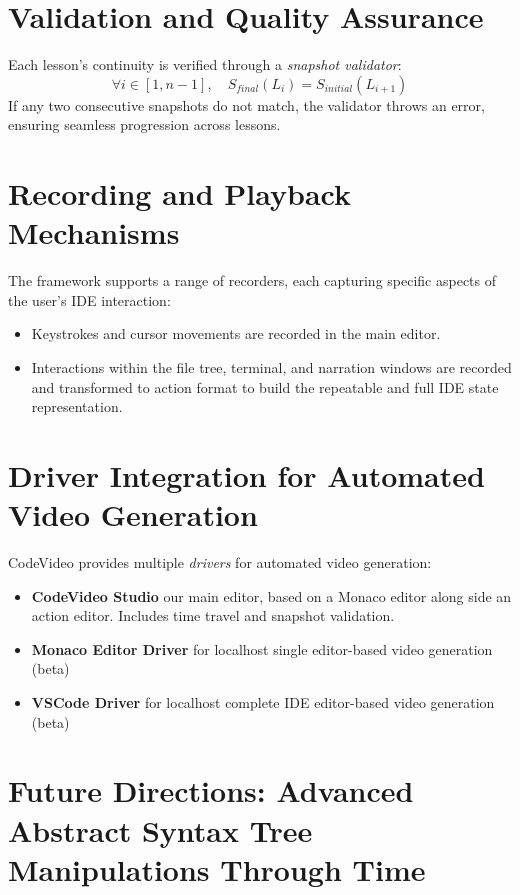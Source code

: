 \documentclass[11pt, a4paper]{article}
\begin{document}
\section{Validation and Quality Assurance}
Each lesson’s continuity is verified through a \textit{snapshot validator}:
\[
\forall i \in [1, n-1], \quad S_{final}(L_i) = S_{initial}(L_{i+1})
\]
If any two consecutive snapshots do not match, the validator throws an error, ensuring seamless progression across lessons.

\section{Recording and Playback Mechanisms}

The framework supports a range of recorders, each capturing specific aspects of the user’s IDE interaction:

\begin{itemize}
    \item Keystrokes and cursor movements are recorded in the main editor.
    \item Interactions within the file tree, terminal, and narration windows are recorded and transformed to action format to build the repeatable and full IDE state representation.
\end{itemize}

\section{Driver Integration for Automated Video Generation}

CodeVideo provides multiple \textit{drivers} for automated video generation:

\begin{itemize}
    \item \textbf{CodeVideo Studio} our main editor, based on a Monaco editor along side an action editor. Includes time travel and snapshot validation.
    \item \textbf{Monaco Editor Driver} for localhost single editor-based video generation (beta)
    \item \textbf{VSCode Driver} for localhost complete IDE editor-based video generation (beta)
\end{itemize}

\section{Future Directions: Advanced Abstract Syntax Tree Manipulations Through Time}
\end{document}
